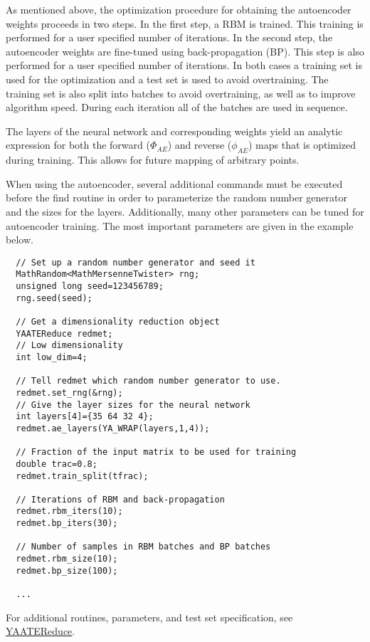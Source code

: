 As mentioned above, the optimization procedure for obtaining the autoencoder weights proceeds in two steps. In the first step, a RBM is trained. This training is performed for a user specified number of iterations. In the second step, the autoencoder weights are fine-tuned using back-propagation (BP). This step is also performed for a user specified number of iterations. In both cases a training set is used for the optimization and a test set is used to avoid overtraining. The training set is also split into batches to avoid overtraining, as well as to improve algorithm speed. During each iteration all of the batches are used in sequence.

The layers of the neural network and corresponding weights yield an analytic expression for both the forward ($\Phi_{AE}$) and reverse ($\phi_{AE}$) maps that is optimized during training. This allows for future mapping of arbitrary points.

When using the autoencoder, several additional commands must be executed before the find routine in order to parameterize the random number generator and the sizes for the layers. Additionally, many other parameters can be tuned for autoencoder training. The most important parameters are given in the example below.



\footnotesize\begin{verbatim}  // Set up a random number generator and seed it
  MathRandom<MathMersenneTwister> rng;
  unsigned long seed=123456789;
  rng.seed(seed);
  
  // Get a dimensionality reduction object
  YAATEReduce redmet;
  // Low dimensionality
  int low_dim=4;
  
  // Tell redmet which random number generator to use.
  redmet.set_rng(&rng);
  // Give the layer sizes for the neural network
  int layers[4]={35 64 32 4};
  redmet.ae_layers(YA_WRAP(layers,1,4));
  
  // Fraction of the input matrix to be used for training
  double trac=0.8;
  redmet.train_split(tfrac);
  
  // Iterations of RBM and back-propagation
  redmet.rbm_iters(10);
  redmet.bp_iters(30);

  // Number of samples in RBM batches and BP batches
  redmet.rbm_size(10);
  redmet.bp_size(100);
  
  ...
\end{verbatim}
\normalsize


For additional routines, parameters, and test set specification, see \hyperlink{class_y_a_a_t_e_reduce}{YAATEReduce}.

